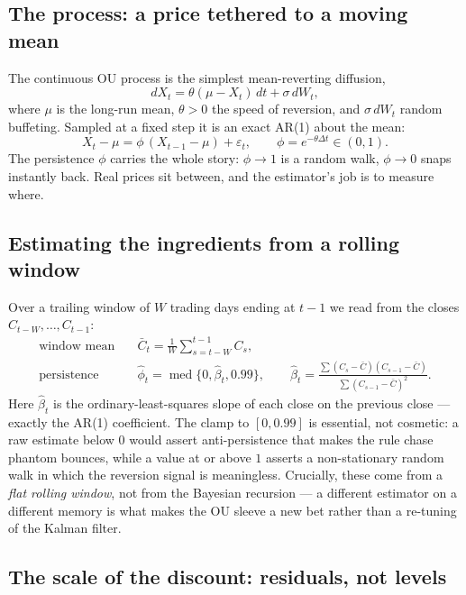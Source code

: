\documentclass[11pt]{article}
\begin{document}
\subsection{The process: a price tethered to a moving mean}
The continuous OU process is the simplest mean-reverting diffusion,
\begin{equation}
dX_t=\theta(\mu-X_t)\,dt+\sigma\,dW_t,
\end{equation}
where $\mu$ is the long-run mean, $\theta>0$ the speed of reversion, and $\sigma\,dW_t$ random
buffeting. Sampled at a fixed step it is an exact AR(1) about the mean:
\begin{equation}\label{eq:ar1}
X_t-\mu=\phi\,(X_{t-1}-\mu)+\varepsilon_t,\qquad \phi=e^{-\theta\Delta t}\in(0,1).
\end{equation}
The persistence $\phi$ carries the whole story: $\phi\to1$ is a random walk, $\phi\to0$ snaps
instantly back. Real prices sit between, and the estimator's job is to measure where.

\subsection{Estimating the ingredients from a rolling window}
Over a trailing window of $W$ trading days ending at $t-1$ we read from the closes
$C_{t-W},\dots,C_{t-1}$:
\begin{align}
\text{window mean}\quad & \bar C_t=\frac1W\sum_{s=t-W}^{t-1}C_s,\\
\text{persistence}\quad & \hat\phi_t=\operatorname{med}\{0,\hat\beta_t,0.99\},\qquad
\hat\beta_t=\frac{\sum (C_s-\bar C)(C_{s-1}-\bar C)}{\sum (C_{s-1}-\bar C)^2}.
\end{align}
Here $\hat\beta_t$ is the ordinary-least-squares slope of each close on the previous close ---
exactly the AR(1) coefficient. The clamp to $[0,0.99]$ is essential, not cosmetic: a raw estimate
below $0$ would assert anti-persistence that makes the rule chase phantom bounces, while a value
at or above $1$ asserts a non-stationary random walk in which the reversion signal is
meaningless. Crucially, these come from a \emph{flat rolling window}, not from the Bayesian
recursion --- a different estimator on a different memory is what makes the OU sleeve a new bet
rather than a re-tuning of the Kalman filter.

\subsection{The scale of the discount: residuals, not levels}\label{sec:sigma}
\end{document}
